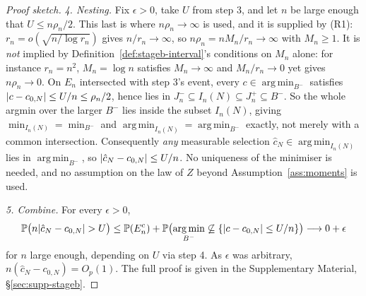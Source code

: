 \documentclass[11pt]{article}
\theoremstyle{plain}
\theoremstyle{definition}
\theoremstyle{remark}
\newcommand{\PP}{\mathbb{P}}
\DeclareMathOperator*{\argmin}{arg\,min}
\DeclarePairedDelimiter{\abs}{\lvert}{\rvert}
\begin{document}
\begin{proof}[Proof sketch]
\emph{4. Nesting.} Fix \(\epsilon>0\), take \(U\) from step 3, and let \(n\)
be large enough that \(U\le n\rho_n/2\). This last is where
\(n\rho_n\to\infty\) is used, and it is supplied by (R1): \(r_n=o(\sqrt{n/\log
r_n})\) gives \(n/r_n\to\infty\), so \(n\rho_n=nM_n/r_n\to\infty\) with
\(M_n\ge1\). It is \emph{not} implied by
Definition~\ref{def:stageb-interval}'s conditions on \(M_n\) alone: for
instance \(r_n=n^2\), \(M_n=\log n\) satisfies \(M_n\to\infty\) and
\(M_n/r_n\to0\) yet gives \(n\rho_n\to0\). On \(E_n\) intersected with step
3's event, every \(c\in\argmin_{B^-}\) satisfies
\(\abs{c-c_{0,N}}\le U/n\le\rho_n/2\), hence lies in
\(J_n^-\subseteq I_n(N)\subseteq J_n^+\subseteq B^-\). So the whole argmin
over the larger \(B^-\) lies inside the subset \(I_n(N)\), giving
\(\min_{I_n(N)}=\min_{B^-}\) and \(\argmin_{I_n(N)}=\argmin_{B^-}\) exactly,
not merely with a common intersection. Consequently \emph{any} measurable
selection \(\hat c_N\in\argmin_{I_n(N)}\) lies in \(\argmin_{B^-}\), so
\(\abs{\hat c_N-c_{0,N}}\le U/n\). No uniqueness of the minimiser is needed,
and no assumption on the law of \(Z\) beyond
Assumption~\ref{ass:moments} is used.

\emph{5. Combine.} For every \(\epsilon>0\),
\[
  \PP\bigl(n\abs{\hat c_N-c_{0,N}}>U\bigr)
  \le
  \PP(E_n^c)
  +\PP\bigl(\argmin_{B^-}\not\subseteq\{\abs{c-c_{0,N}}\le U/n\}\bigr)
  \longrightarrow 0+\epsilon
\]
for \(n\) large enough, depending on \(U\) via step 4. As \(\epsilon\) was
arbitrary, \(n(\hat c_N-c_{0,N})=O_p(1)\). The full proof is given in the
Supplementary Material, \S\ref{sec:supp-stageb}.
\end{proof}
\end{document}
